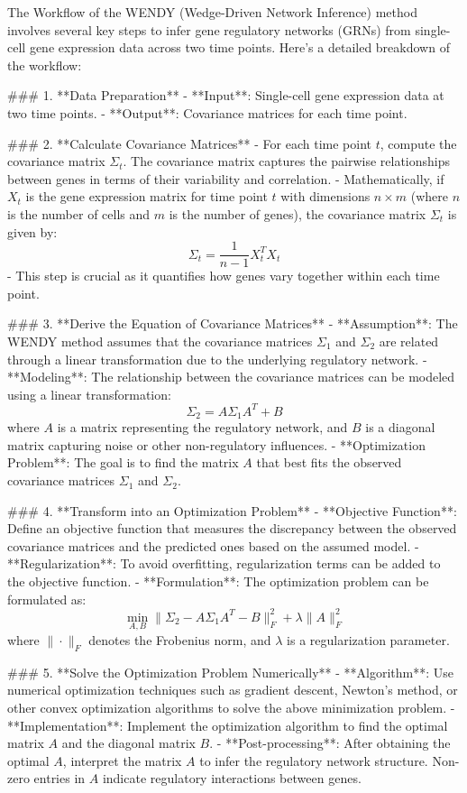 The Workflow of the WENDY (Wedge-Driven Network Inference) method involves several key steps to infer gene regulatory networks (GRNs) from single-cell gene expression data across two time points. Here's a detailed breakdown of the workflow:

### 1. **Data Preparation**
   - **Input**: Single-cell gene expression data at two time points.
   - **Output**: Covariance matrices for each time point.

### 2. **Calculate Covariance Matrices**
   - For each time point \( t \), compute the covariance matrix \( \Sigma_t \). The covariance matrix captures the pairwise relationships between genes in terms of their variability and correlation.
   - Mathematically, if \( X_t \) is the gene expression matrix for time point \( t \) with dimensions \( n \times m \) (where \( n \) is the number of cells and \( m \) is the number of genes), the covariance matrix \( \Sigma_t \) is given by:
     \[
     \Sigma_t = \frac{1}{n-1} X_t^T X_t
     \]
   - This step is crucial as it quantifies how genes vary together within each time point.

### 3. **Derive the Equation of Covariance Matrices**
   - **Assumption**: The WENDY method assumes that the covariance matrices \( \Sigma_1 \) and \( \Sigma_2 \) are related through a linear transformation due to the underlying regulatory network.
   - **Modeling**: The relationship between the covariance matrices can be modeled using a linear transformation:
     \[
     \Sigma_2 = A \Sigma_1 A^T + B
     \]
     where \( A \) is a matrix representing the regulatory network, and \( B \) is a diagonal matrix capturing noise or other non-regulatory influences.
   - **Optimization Problem**: The goal is to find the matrix \( A \) that best fits the observed covariance matrices \( \Sigma_1 \) and \( \Sigma_2 \).

### 4. **Transform into an Optimization Problem**
   - **Objective Function**: Define an objective function that measures the discrepancy between the observed covariance matrices and the predicted ones based on the assumed model.
   - **Regularization**: To avoid overfitting, regularization terms can be added to the objective function.
   - **Formulation**: The optimization problem can be formulated as:
     \[
     \min_{A, B} \| \Sigma_2 - A \Sigma_1 A^T - B \|_F^2 + \lambda \| A \|_F^2
     \]
     where \( \| \cdot \|_F \) denotes the Frobenius norm, and \( \lambda \) is a regularization parameter.

### 5. **Solve the Optimization Problem Numerically**
   - **Algorithm**: Use numerical optimization techniques such as gradient descent, Newton's method, or other convex optimization algorithms to solve the above minimization problem.
   - **Implementation**: Implement the optimization algorithm to find the optimal matrix \( A \) and the diagonal matrix \( B \).
   - **Post-processing**: After obtaining the optimal \( A \), interpret the matrix \( A \) to infer the regulatory network structure. Non-zero entries in \( A \) indicate regulatory interactions between genes.

